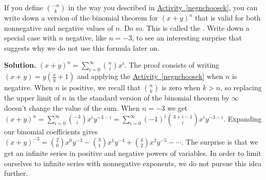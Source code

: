 \documentclass{book}
\begin{document}
\setcounter{project}{254}
\addtocounter{project}{-1}
\begin{activity}[]\label{activity-247}
\hypertarget{p-1348}{}%
If you define \(\binom{-n}{k}\) in the way you described in \hyperref[negnchoosek]{Activity~\ref{negnchoosek}}, you can write down a version of the binomial theorem for \((x+y)^n\) that is valid for both nonnegative and negative values of \(n\). Do so. This is called the . Write down a special case with \(n\) negative, like \(n=-3\), to see an interesting surprise that suggests why we do not use this formula later on.%
\par\smallskip%
\noindent\textbf{Solution.}\hypertarget{solution-165}{}\quad%
\hypertarget{p-1349}{}%
\((x+y)^n=\sum_{i=0}^\infty\binom{n}{i}x^i\). The proof consists of writing \((x+y)=y(\frac{x}{y}+1)\) and applying the \hyperref[negnchoosek]{Activity~\ref{negnchoosek}} when \(n\) is negative. When \(n\) is positive, we recall that \(\binom{n}{k}\) is zero when \(k>n\), so replacing the upper limit of \(n\) in the standard version of the binomial theorem by \(\infty\) doesn't change the value of the sum. When \(n=-3\) we get \((x+y)^n = \sum_{i=0}^\infty \binom{-3}{i}x^iy^{-3-i} = \sum_{i=0}^\infty (-1)^i \binom{3+i-1}{i}x^iy^{-3-i}\). Expanding our binomial coefficients gives \((x+y)^{-3} = \binom{2}{0}x^0y^{-3} -\binom{3}{1}x^1y^{-4} + \binom{4}{2}x^2y^{-5}-\cdots.\) The surprise is that we get an infinite series in positive and negative powers of variables. In order to limit ourselves to infinite series with nonnegative exponents, we do not pursue this idea further.%
\end{activity}
\end{document}
